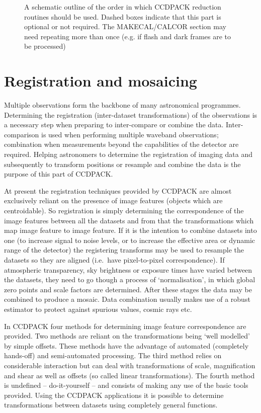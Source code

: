 \begin{figure}
\begin{center}
\end{center}
\caption{\label{red:seq} A schematic outline of the order in which
CCDPACK reduction routines should be used. Dashed boxes indicate that
this part is optional or not required. The MAKECAL/CALCOR section may
need repeating more than once (e.g. if flash and dark frames are to be
processed)}
\end{figure}

\clearpage

\section{Registration and mosaicing}

Multiple observations form the backbone of many astronomical programmes.
Determining the registration (inter-dataset transformations) of the
observations is a necessary step when preparing to inter-compare or
combine the data. Inter-comparison is used when performing multiple
waveband observations; combination when measurements beyond the
capabilities of the detector are required. Helping astronomers to
determine the registration of imaging data and subsequently to transform
positions or resample and combine the data is the purpose of this part
of CCDPACK.

At present the registration techniques provided by CCDPACK are almost
exclusively reliant on the presence of image features (objects which are
centroidable). So registration is simply determining the correspondence
of the image features between all the datasets and from that the
transformations which map image feature to image feature. If it is the
intention to combine datasets into one (to increase signal to noise
levels, or to increase the effective area or dynamic range of the 
detector) the registering transforms may be used to resample the
datasets so they are aligned (i.e.\ have pixel-to-pixel correspondence).
If atmospheric transparency, sky brightness or exposure times have 
varied between the datasets, they need to go though a process of
`normalisation', in which global zero points and scale factors are
determined. After these stages the data may be combined to produce
a mosaic. Data combination usually makes use of a robust estimator to
protect against spurious values, cosmic rays etc.

In CCDPACK four methods for determining image feature correspondence
are provided. Two methods are reliant on the transformations being `well
modelled' by simple offsets. These methods have the advantage of
automated (completely hands-off) and semi-automated processing. The
third method relies on considerable interaction but can
deal with transformations of scale, magnification and shear as well as
offsets (so called linear transformations). The fourth method is
undefined -- do-it-yourself -- and consists of making any use of the
basic tools provided. Using the CCDPACK applications it is possible to
determine transformations between datasets using completely general 
functions.
